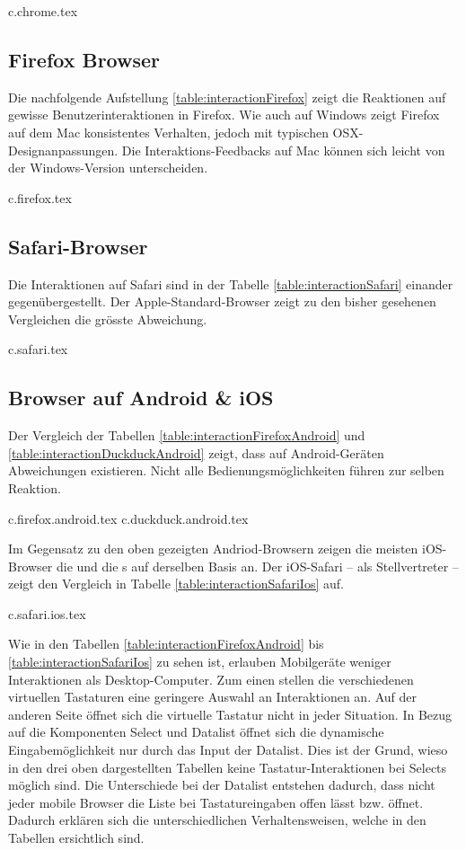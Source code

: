 {c.chrome.tex}


\clearpage
\subsection{Firefox Browser}
\label{sec:firefoxBrowser}

Die nachfolgende Aufstellung \ref{table:interactionFirefox} zeigt die Reaktionen auf gewisse Benutzerinteraktionen in Firefox. 
Wie auch auf Windows zeigt Firefox auf dem Mac konsistentes Verhalten, jedoch mit typischen OSX-Designanpassungen. 
Die Interaktions-Feedbacks auf Mac können sich leicht von der Windows-Version unterscheiden. 

{c.firefox.tex}


\clearpage
\subsection{Safari-Browser}
\label{sec:safariBrowser}

Die Interaktionen auf Safari sind in der Tabelle \ref{table:interactionSafari} einander gegenübergestellt. 
Der Apple-Standard-Browser zeigt zu den bisher gesehenen Vergleichen die grösste Abweichung. 

{c.safari.tex}


\clearpage
\subsection{Browser auf Android \& iOS}
\label{sec:mobileBrowser}

Der Vergleich der Tabellen \ref{table:interactionFirefoxAndroid} und \ref{table:interactionDuckduckAndroid} zeigt, dass auf Android-Geräten Abweichungen existieren. 
Nicht alle Bedienungsmöglichkeiten führen zur selben Reaktion.

{c.firefox.android.tex}
{c.duckduck.android.tex}

\clearpage
Im Gegensatz zu den oben gezeigten Andriod-Browsern zeigen die meisten iOS-Browser die  und die s auf derselben Basis an. 
Der iOS-Safari – als Stellvertreter – zeigt den Vergleich in Tabelle \ref{table:interactionSafariIos} auf. 

{c.safari.ios.tex}

Wie in den Tabellen \ref{table:interactionFirefoxAndroid} bis \ref{table:interactionSafariIos} zu sehen ist, erlauben Mobilgeräte weniger Interaktionen als Desktop-Computer. 
Zum einen stellen die verschiedenen virtuellen Tastaturen eine geringere Auswahl an Interaktionen an. 
Auf der anderen Seite öffnet sich die virtuelle Tastatur nicht in jeder Situation. 
In Bezug auf die Komponenten Select und Datalist öffnet sich die dynamische Eingabemöglichkeit nur durch das Input der Datalist. 
Dies ist der Grund, wieso in den drei oben dargestellten Tabellen keine Tastatur-Interaktionen bei Selects möglich sind. 
Die Unterschiede bei der Datalist entstehen dadurch, dass nicht jeder mobile Browser die Liste bei Tastatureingaben offen lässt bzw. öffnet. 
Dadurch erklären sich die unterschiedlichen Verhaltensweisen, welche in den Tabellen ersichtlich sind. 

